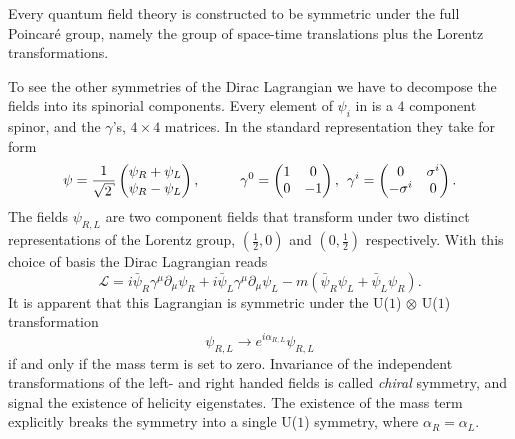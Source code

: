 Every quantum field theory is constructed to be symmetric under the full
Poincar\'e group, namely the group of space-time translations plus the Lorentz
transformations. 

To see the other symmetries of the Dirac Lagrangian we have to decompose the
fields into its spinorial components. Every element of $\psi_i$ in
 is a $4$ component spinor, and the $\gamma$'s, $4 \times 4$
matrices. In the standard representation they take for form
%
\begin{equation}
  \psi = \frac{1}{\sqrt{2}} \begin{pmatrix} \psi_R + \psi_L \\ \psi_R - \psi_L \end{pmatrix}, \hskip1cm
    \gamma^0 = \begin{pmatrix} 1 & 0 \\ 0 & -1 \end{pmatrix}, \hskip1ex
    \gamma^i = \begin{pmatrix} 0 & \sigma^i \\ -\sigma^i & 0 \end{pmatrix}.
\end{equation}
%
The fields $\psi_{R,L}$ are two component fields that transform under two
distinct representations of the Lorentz group, $(\frac{1}{2}, 0)$ and $(0,
\frac{1}{2})$ respectively. With this choice of basis the Dirac Lagrangian reads
%
\begin{equation}
  \mathcal{L} = i \bar{\psi}_R \gamma^{\mu}\partial_{\mu} \psi_R
    + i \bar{\psi}_L \gamma^{\mu}\partial_{\mu} \psi_L
    - m (\bar{\psi}_R\psi_L + \bar{\psi}_L\psi_R).
\end{equation}
%
It is apparent that this Lagrangian is symmetric under the U($1$) $\otimes$ U($1$)
transformation
%
\begin{equation} \label{eq:chiral_transformation}
  \psi_{R,L} \to e^{i \alpha_{R,L}} \psi_{R,L}
\end{equation}
%
if and only if the mass term is set to zero. Invariance of the independent
transformations of the left- and right handed fields is called \emph{chiral}
symmetry, and signal the existence of helicity eigenstates. The existence of the
mass term explicitly breaks the symmetry into a single U($1$) symmetry, where
$\alpha_R = \alpha_L$.

